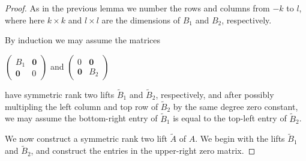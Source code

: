 \documentclass{article}
\begin{document}
\begin{proof}
  As in the previous lemma we number the rows and columns from $-k$ to $l$, where here $k \times k$ and $l \times l$ are the dimensions of $B_{1}$ and $B_{2}$, respectively.
  
  By induction we may assume the matrices
  \begin{center}
    $\left(\begin{array}{cc} B_{1} & \textbf{0} \\ \textbf{0} & 0 \end{array}\right)$ \hspace{.1 in} and \hspace{.1 in} $\left(\begin{array}{cc} 0 & \textbf{0} \\ \textbf{0} & B_{2} \end{array}\right)$
  \end{center}
  have symmetric rank two lifts $\tilde{B}_{1}$ and $\tilde{B}_{2}$, respectively, and after possibly multipling the left column and top row of $\tilde{B}_{2}$ by the same degree zero constant, we may assume the bottom-right entry of $\tilde{B}_{1}$ is equal to the top-left entry of $\tilde{B}_{2}$.
  
  We now construct a symmetric rank two lift $\tilde{A}$ of $A$. We begin with the lifts $\tilde{B}_{1}$ and $\tilde{B}_{2}$, and construct the entries in the upper-right zero matrix.
  

\end{proof}
\end{document}
